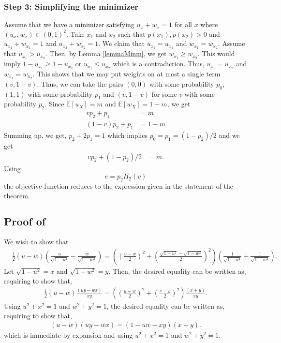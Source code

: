 \documentclass[conference,letterpaper,onecolumn]{IEEEtran}
\theoremstyle{plain}%
\begin{document}
\subsubsection{Step 3: Simplifying the minimizer}
Assume that we have a minimizer satisfying $u_x+w_x=1$ for all $x$ where $(u_x,w_x)\in(0,1)^2$. Take $x_1$ and $x_2$ such that $p(x_1), p(x_2)>0$ and  $u_{x_1}+w_{x_1}=1$ and $u_{x_2}+w_{x_2}=1$. We claim that $u_{x_1}=u_{x_2}$ and $w_{x_1}=w_{x_2}$. Assume that $u_{x_1}> u_{x_2}$. Then, by Lemma \ref{lemmaMinm}, we get $w_{x_1}\geq w_{x_2}$. This would imply $1-u_{x_1}\geq 1-u_{x_2}$ or $u_{x_1}\leq u_{x_2}$ which is a contradiction. Thus, $u_{x_1}=u_{x_2}$ and $w_{x_1}=w_{x_2}$. This shows that we may put weights on at most a single term $(v,1-v)$. Thus, we can take the pairs $(0,0)$ with some probability $p_0$, $(1,1)$ with some probability $p_1$ and $(v,1-v)$ for some $v$ with some probability $p_2$. Since $\mathbb{E}[u_X]=m$ and $\mathbb{E}[w_X]=1-m$, we get
\begin{align}
    vp_2+p_1&=m\\
(1-v)p_2+p_1&=1-m
\end{align}
Summing up, we get, $p_2+2p_1=1$ which implies $p_0=p_1=(1-p_2)/2$ and we get
\begin{align}
    vp_2+(1-p_2)/2&=m.\end{align}
Using 
$$e=p_2H_2(v)$$
the objective function reduces to the expression given in the statement of the theorem.


\subsection{Proof of }
We wish to show that
{\begin{align*}
        &\frac{1}{2}  (u - w)\left(\frac{u}{\sqrt{1-u^2}} - \frac{w}{\sqrt{1-w^2}} \right)= \left(\left(\frac{u-w}{2}\right)^2 + \left(\frac{\sqrt{1-u^2}-\sqrt{1-w^2}}{2}\right)^2\right)\left(\frac{1}{\sqrt{1-u^2}} + \frac{1}{\sqrt{1-w^2}} \right).
    \end{align*}}
    Let $\sqrt{1-u^2}=x$ and $\sqrt{1-w^2}=y$. Then, the desired equality can be written as, requiring to show that,
    \begin{align*}
        \frac{1}{2}  (u - w)\frac{(uy-wx)}{xy} = \left(\left(\frac{u-w}{2}\right)^2 + \left(\frac{x-y}{2}\right)^2\right)\frac{(x+y)}{xy}.
    \end{align*}
    Using $u^2+x^2=1$ and $w^2+y^2=1$, the desired equality can be written as, requiring to show that,
    \begin{align*}
          (u - w)(uy-wx) = (1-uw-xy)(x+y).
    \end{align*}
    which is immediate by expansion and using $u^2+x^2=1$ and $w^2+y^2=1$.
\end{document}
